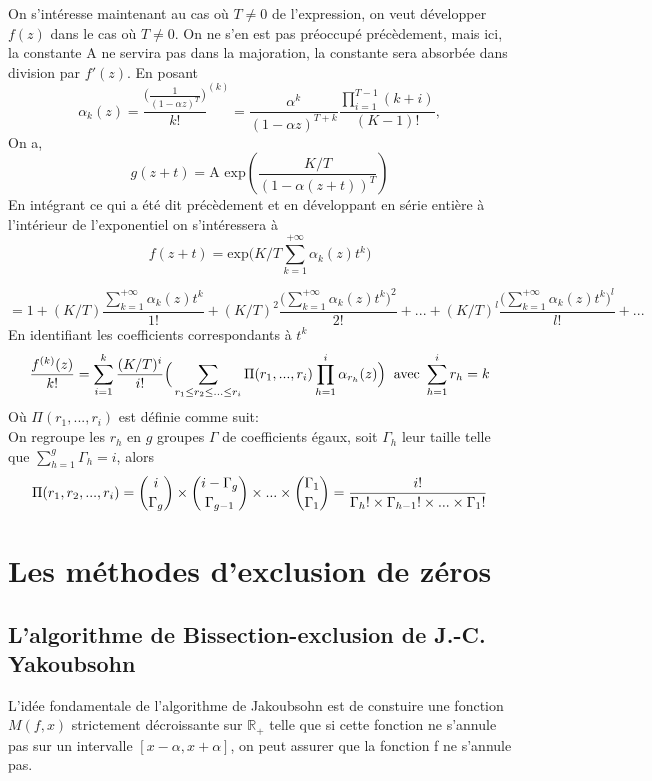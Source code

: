 \documentclass[a4paper,10.5pt]{article}
\begin{document}
	\vspace{1cm} 
	
	On s'intéresse maintenant au cas où $T\neq 0$ de l'expression, on veut développer $f(z)$ dans le cas où $T \neq 0$. On ne s'en est pas préoccupé précèdement, mais ici, la constante A ne servira pas dans la majoration, la constante sera absorbée dans division par $f'(z)$. En posant \[\alpha_{k}(z)=\frac{\big(\frac{1}{(1-\alpha z)^{T}}\big)}{k!}^{(k)}=\frac{\alpha^{k}}{(1-\alpha z)^{T+k}} \frac{\prod_{i=1}^{T-1}(k+i)}{(K-1)!},\] On a,
	\[g(z+t)=\text{A exp}(\frac{K/T}{(1-\alpha (z+t))^{T}})\]
	En intégrant ce qui a été dit précèdement et en développant en série entière à l'intérieur de l'exponentiel on s'intéressera à
	\[f(z+t)=\text{exp}\Big(K/T \sum_{k=1}^{+\infty}\alpha_{k}(z)t^{k} \Big)\]
	
	\[= 1+(K/T)\frac{\sum_{k=1}^{+\infty}\alpha_{k}(z)t^{k}}{1!}+(K/T)^{2}\frac{\big(\sum_{k=1}^{+\infty}\alpha_{k}(z)t^{k}\big)^{2}}{2!}+...+(K/T)^{l}\frac{\big(\sum_{k=1}^{+\infty}\alpha_{k}(z)t^{k}\big)^{l}}{l!}+...\]
	En identifiant les coefficients correspondants à $t^{k}$
	\[\frac{f^{(k)}(z)}{k!}=\sum_{i=1}^{k}\frac{(K/T)^{i}}{i!}\Big(\sum_{r_{1}\leq r_{2}\leq ...\leq{r_{i}}}\Pi(r_{1},...,r_{i})\prod_{h=1}^{i}\alpha_{r_{h}}(z) \Big) \hspace{2mm} \text{avec }\sum_{h=1}^{i} r_{h}=k\]
	Où $\Pi(r_{1},...,r_{i})$ est définie comme suit:\\
	On regroupe les $r_{h}$ en $g$ groupes $\Gamma$ de coefficients égaux, soit $\Gamma_{h}$ leur taille telle que $\sum_{h=1}^{g}\Gamma_{h}=i$, alors
	\[\Pi(r_{1},r_{2},...,r_{i})=\dbinom{i}{\Gamma_{g}}\times \dbinom{i-\Gamma_{g}}{\Gamma_{g-1}}\times ...\times \dbinom{\Gamma_{1}}{\Gamma_{1}}=\frac{i!}{\Gamma_h! \times \Gamma_{h-1}! \times ... \times \Gamma_1!}\]
	
	
	\newpage
	\section{Les méthodes d'exclusion de zéros}
	\subsection{L'algorithme de Bissection-exclusion de J.-C. Yakoubsohn}
	L'idée fondamentale de l'algorithme de Jakoubsohn est de constuire une fonction $M(f,x)$ strictement décroissante sur $\mathbb{R}_+$ telle que si cette fonction ne s'annule pas sur un intervalle $[x-\alpha,x+\alpha]$, on peut assurer que la fonction f ne s'annule pas.
	
\end{document}
